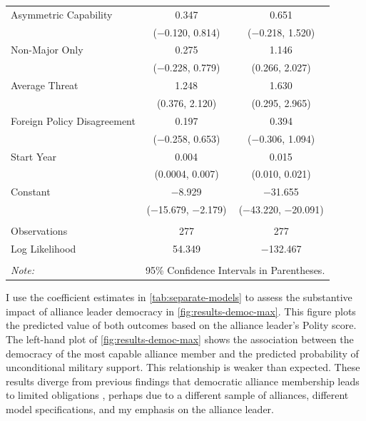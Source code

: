\documentclass[12pt]{article}
\begin{document}
\begin{table}[!htbp]
\begin{tabular}{@{\extracolsep{5pt}}lcc}
  Asymmetric Capability & 0.347 & 0.651 \\ 
  & ($-$0.120, 0.814) & ($-$0.218, 1.520) \\ 
  Non-Major Only & 0.275 & 1.146$^{}$ \\ 
  & ($-$0.228, 0.779) & (0.266, 2.027) \\ 
  Average Threat & 1.248$^{}$ & 1.630$^{}$ \\ 
  & (0.376, 2.120) & (0.295, 2.965) \\ 
  Foreign Policy Disagreement & 0.197 & 0.394 \\ 
  & ($-$0.258, 0.653) & ($-$0.306, 1.094) \\ 
  Start Year & 0.004$^{}$ & 0.015$^{}$ \\ 
  & (0.0004, 0.007) & (0.010, 0.021) \\ 
  Constant & $-$8.929$^{}$ & $-$31.655$^{}$ \\ 
  & ($-$15.679, $-$2.179) & ($-$43.220, $-$20.091) \\ 
 \hline \\[-1.8ex] 
Observations & 277 & 277 \\ 
Log Likelihood & 54.349 & $-$132.467 \\ 
\hline 
\hline \\[-1.8ex] 
\textit{Note:}  & \multicolumn{2}{r}{95\% Confidence Intervals in Parentheses.} \\ 
\end{tabular} 
\end{table} 


I use the coefficient estimates in \autoref{tab:separate-models} to assess the substantive impact of alliance leader democracy in \autoref{fig:results-democ-max}.
This figure plots the predicted value of both outcomes based on the alliance leader's Polity score. 
The left-hand plot of \autoref{fig:results-democ-max} shows the association between the democracy of the most capable alliance member and the predicted probability of unconditional military support. 
This relationship is weaker than expected.  
These results diverge from previous findings that democratic alliance membership leads to limited obligations \citep{Mattes2012, Chibaetal2015}, perhaps due to a different sample of alliances, different model specifications, and my emphasis on the alliance leader. 
\end{document}
